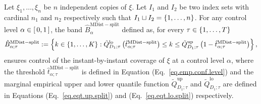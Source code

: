 \documentclass[11pt]{article}
\begin{document}
\begin{proposition}
\label{prop.ibib.mdist.split}
Let $\xi_1, \ldots, \xi_n$ be $n$ independent copies of $\xi$.
Let $I_1$ and $I_2$ be two index sets with cardinal $n_1$ and $n_2$ respectively such that
$I_1 \sqcup I_2 = \left\{ 1, \ldots, n \right\}$.
%
%
%
For any control level $\alpha \in \left[\, 0, 1 \,\right]$,
the band $\hat{B}^{\mathrm{MDist-split}}_{\alpha}$ defined as,
for every $\tau \in \left\{ 1, \ldots, T \right\}$
\begin{align}
    \label{eq.ibib.mdist.split}
    \hat{B}_{\alpha; \tau}^{\mathrm{MDist-split}} :=
    \left\{ 
        k \in \left\{ 1, \ldots, K \right\} :
        \tilde{Q}_{D_1; \tau}^{\mathrm{lo}} \left( \hat{t}_{\alpha; \tau}^{\mathrm{MDist-split}} \right)
        \leq k \leq \tilde{Q}_{D_1; \tau}^{\mathrm{up}} \left( 1 - \hat{t}_{\alpha; \tau}^{\mathrm{MDist-split}} \right)
     \right\},
\end{align}
ensures control of the instant-by-instant coverage of $\xi$ at a control level $\alpha$,
where the threshold $\hat{t}_{\alpha; \tau}^{\mathrm{MDist-split}}$ is defined in Equation (Eq.~\eqref{eq.emp.conf.level})
and the marginal empirical upper and lower quantile function $\tilde{Q}_{D_1; \tau}^{\mathrm{up}}$
and $\tilde{Q}_{D_1; \tau}^{\mathrm{lo}}$ are defined in Equations (Eq.~\eqref{eq.eqt.up.split}) and (Eq.~\eqref{eq.eqt.lo.split})
respectively.
\end{proposition}
%
%
%
\end{document}
